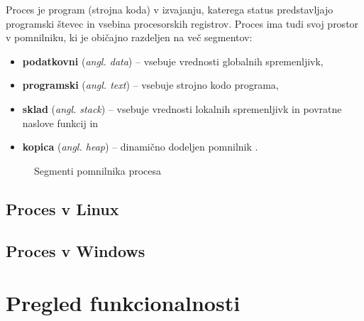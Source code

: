 \documentclass[a4paper,12pt,openright]{book}
\begin{document}
Proces je program (strojna koda) v izvajanju, katerega status predstavljajo programski števec in vsebina procesorskih registrov.
Proces ima tudi svoj prostor v pomnilniku, ki je običajno razdeljen na več segmentov:
\begin{itemize}
	\item \textbf{podatkovni} (\textit{angl. data}) -- vsebuje vrednosti globalnih spremenljivk,
	\item \textbf{programski} (\textit{angl. text}) -- vsebuje strojno kodo programa,
	\item \textbf{sklad} (\textit{angl. stack}) -- vsebuje vrednosti lokalnih spremenljivk in povratne naslove funkcij in
	\item \textbf{kopica} (\textit{angl. heap}) -- dinamično dodeljen pomnilnik \cite{Silberschatz_Galvin_Gagne_2018}.
\end{itemize}

\begin{figure}[h!]
	\begin{center}
	\end{center}
	\caption{Segmenti pomnilnika procesa \cite{Silberschatz_Galvin_Gagne_2018}}
\end{figure}

\subsection{Proces v Linux}

\subsection{Proces v Windows}

\section{Pregled funkcionalnosti}
\end{document}
